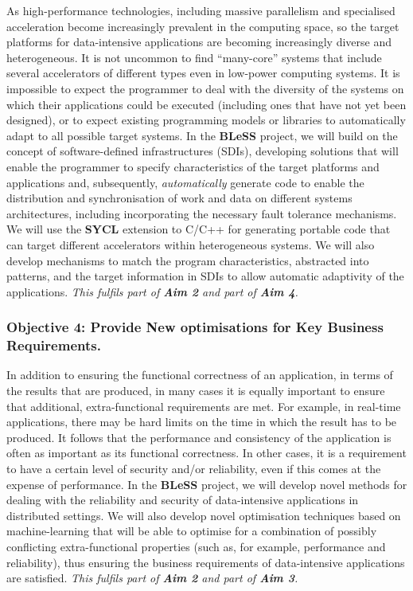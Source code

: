 \documentclass[a4paper,11pt]{article}
\newcommand{\project}[1]{\textbf{#1}\xspace}
\newcommand{\BLESS}{\project{BLeSS}}
\newcommand{\TheProject}{\BLESS}
\begin{document}
As high-performance technologies, including massive parallelism and specialised acceleration become increasingly
prevalent in the computing space,
% 
so the target platforms for data-intensive applications are 
becoming increasingly diverse and heterogeneous. It is not uncommon to find ``many-core'' systems that include several
accelerators of different types even in low-power computing systems. It is impossible to expect the programmer
to deal with the diversity of the systems on which their applications could be executed (including ones that have not yet been
designed), or to expect existing programming models or libraries to automatically adapt to all possible target systems. In the \TheProject{} project,
we will build on the concept of software-defined infrastructures (SDIs), developing solutions that will
enable the programmer to specify characteristics of the target platforms and applications and,
subsequently, \emph{automatically} generate code to enable the distribution and synchronisation of work and data on different systems
architectures, including incorporating the necessary fault tolerance mechanisms. We will use the \textbf{SYCL} extension to C/C++ for generating portable code that can target different accelerators within heterogeneous systems. We will also develop mechanisms to match the program characteristics,
abstracted into patterns, and the target information in SDIs to allow automatic adaptivity of the applications.
\newline
\emph{This fulfils part of \textbf{Aim 2} and part of \textbf{Aim 4}.}

\subsubsection*{Objective 4: Provide New optimisations for Key Business Requirements.} %
\vspace{-6pt}

In addition to ensuring the functional correctness of an application, in terms of the 
results that are produced, in many cases it is equally important to ensure that additional, extra-functional requirements
are met. For example, in real-time applications, there may be hard limits on the time in which the result has to be
produced.  It follows that the performance and consistency of the application is often as important as its functional correctness. 
In other  cases, it is a requirement to have a certain level of security and/or reliability, even if this comes at the 
expense of performance. In the \TheProject{} project, we will develop novel methods for dealing with the reliability and 
security of data-intensive applications in distributed settings. We will also develop novel optimisation
techniques based on machine-learning that will be able to optimise for a combination of possibly conflicting 
extra-functional properties (such as, for example, performance and reliability), thus ensuring the business 
requirements of data-intensive applications are satisfied.
\newline
\emph{This fulfils part of \textbf{Aim 2} and part of \textbf{Aim 3}.}
\end{document}
